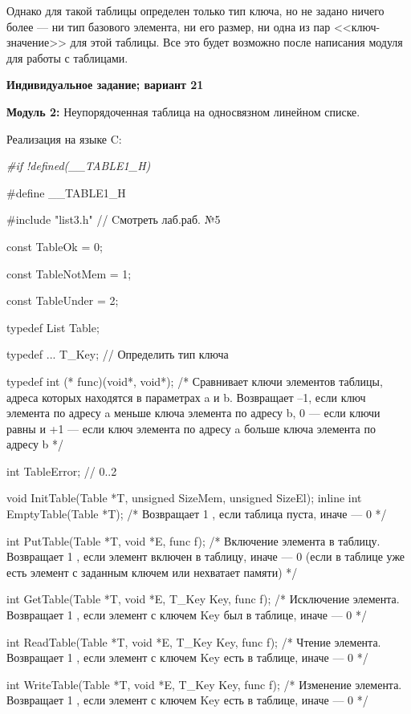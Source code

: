 \documentclass[12pt]{article}
\begin{document}
{	
	
	Однако для такой таблицы определен только тип ключа, но не задано ничего более --- ни тип базового элемента, ни его размер, ни одна из пар <<ключ-значение>> для этой таблицы. Все это будет возможно после написания модуля для работы с таблицами. 
	
	
	\begin{center}
	{\bf Индивидуальное задание; вариант 21}
	\end{center}
	{\bf Модуль 2:} Неупорядоченная таблица на односвязном линейном списке.
	
	Реализация на языке C:
	
	{\it \#if !defined(\_\_TABLE1\_H)
	
	\#define \_\_TABLE1\_H
	
	\#include "list3.h" // Cмотреть лаб.раб. №5
	
	const TableOk = 0;
	
	const TableNotMem = 1;
	
	const TableUnder = 2;
	
	typedef List Table;
	
	typedef ... T\_Key; // Определить тип ключа
	
	typedef int (* func)(void*, void*); /* Сравнивает ключи элементов таблицы, адреса которых находятся в параметрах a и b. Возвращает –1, если ключ элемента по адресу a меньше ключа элемента по адресу b, 0 — если ключи равны и +1 — если ключ элемента по адресу a больше ключа элемента по адресу b */
	
	int TableError; // 0..2
	
	void InitTable(Table *T, unsigned SizeMem, unsigned SizeEl); 
	inline int EmptyTable(Table *T); /* Возвращает 1 , если таблица пуста, иначе — 0 */
	
	int PutTable(Table *T, void *E, func f); /* Включение элемента в таблицу. Возвращает 1 , если элемент включен в таблицу, иначе — 0 (если в таблице уже есть элемент с заданным ключем или нехватает памяти) */
	
	int GetTable(Table *T, void *E,  T\_Key Key, func f);  /* Исключение элемента. Возвращает 1 , если элемент с ключем Key  был в таблице, иначе — 0 */
	
	int ReadTable(Table *T, void *E, T\_Key Key, func f); /* Чтение элемента. Возвращает 1 , если элемент с ключем Key есть в таблице, иначе — 0 */
	
	int WriteTable(Table *T, void *E, T\_Key Key, func f);  /* Изменение элемента. Возвращает 1 , если элемент с ключем Key есть в таблице, иначе — 0 */
	
}}
\end{document}
